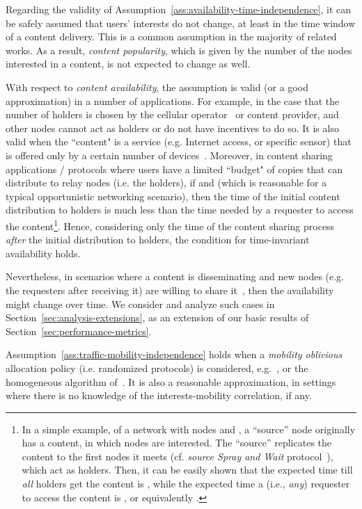 \documentclass[journal]{IEEEtran}
\newcommand{\revisionRed}[1]{{#1}}\newcommand{\red}[1]{{#1}}
\begin{document}
\red{Regarding the validity of Assumption~\ref{ass:availability-time-independence}, it can be safely assumed that users' interests do not change, at least in the time window of a content delivery. This is a common assumption in the majority of related works. As a result, \textit{content popularity}, which is given by the number of the nodes interested in a content, is not expected to change as well.}

\red{With respect to \textit{content availability}, the assumption is valid (or a good approximation) in a number of applications. For example, in the case that the number of holders is chosen by the cellular operator~\cite{Hui-Offloading,multiple-offloading} or content provider, and other nodes cannot act as holders or do not have incentives to do so. It is also valid when the ``content" is a service (e.g. Internet access, or specific sensor) that is offered only by a certain number of devices~\cite{Scampi-OppComp}. Moreover, in content sharing applications / protocols where users have a limited ``budget" of  copies that can distribute to relay nodes (i.e. the holders), if  and  (which is reasonable for a typical opportunistic networking scenario), then the time of the initial content distribution to holders is much less than the time needed by a requester to access the content\footnote{\revisionRed{In a simple example, of a network with  nodes and , a ``source'' node originally has a content, in which  nodes are interested. The ``source'' replicates the content to the first  nodes it meets (cf. \textit{source Spray and Wait} protocol~\cite{spray-and-wait}), which act as holders. Then, it can be easily shown that the expected time till \textit{all} holders get the content is , while the expected time a (i.e., \textit{any}) requester to access the content is , or equivalently .}}. Hence, considering only the time of the content sharing process \textit{after} the initial distribution to holders, the condition for time-invariant availability holds.}


\red{Nevertheless, in scenarios where a content is disseminating and new nodes (e.g. the requesters after receiving it) are willing to share it~\cite{offloading-wowmom11}, then the availability might change over time. We consider and analyze such cases in Section~\ref{sec:analysis-extensions}, as an extension of our basic results of Section~\ref{sec:performance-metrics}.}



\red{Assumption~\ref{ass:traffic-mobility-independence} holds when a \textit{mobility oblivious} allocation policy (i.e. randomized protocols) is considered, e.g.~\cite{CEDO}, or the homogeneous algorithm of~\cite{multiple-offloading}. It is also a reasonable approximation, in settings where there is no knowledge of the interests-mobility correlation, if any.}
\end{document}
